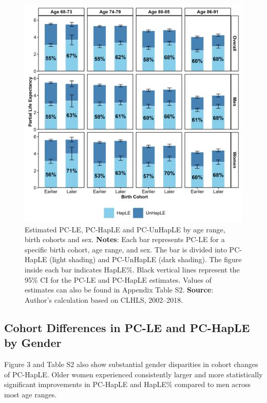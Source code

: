 \documentclass[12pt, a4paper]{article}
\begin{document}
\begin{figure}[!p]
  \centering
  \includegraphics[width=1\textwidth]{fig_tabs_b300/2_2_HapLE_stacked_plots_sex.png}
  \caption{Estimated PC-LE, PC-HapLE and PC-UnHapLE by age range, birth cohorts and sex. \textbf{Notes}: Each bar represents PC-LE for a specific birth cohort, age range, and sex. The bar is divided into PC-HapLE (light shading) and PC-UnHapLE (dark shading). The figure inside each bar indicates HapLE\%. Black vertical lines represent the 95\% CI for the PC-LE and PC-HapLE estimates. Values of estimates can also be found in Appendix Table S2. \textbf{Source}: Author's calculation based on CLHLS, 2002–2018.}
\end{figure}

\subsection{Cohort Differences in PC-LE and PC-HapLE by Gender}

Figure 3 and Table S2 also show substantial gender disparities in cohort changes of PC-HapLE. Older women experienced consistently larger and more statistically significant improvements in PC-HapLE and HapLE\% compared to men across most age ranges.
\end{document}

